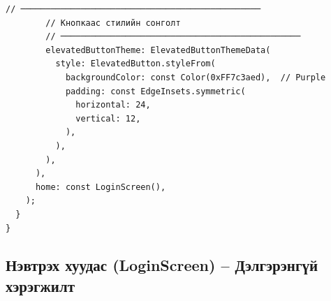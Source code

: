 \begin{lstlisting}[caption={main.dart -- ThemeData дэлгэрэнгүй}]
        // ────────────────────────────────────────────────
        // Кнопкаас стилийн сонголт
        // ────────────────────────────────────────────────
        elevatedButtonTheme: ElevatedButtonThemeData(
          style: ElevatedButton.styleFrom(
            backgroundColor: const Color(0xFF7c3aed),  // Purple
            padding: const EdgeInsets.symmetric(
              horizontal: 24,
              vertical: 12,
            ),
          ),
        ),
      ),
      home: const LoginScreen(),
    );
  }
}
\end{lstlisting}

\subsection{Нэвтрэх хуудас (LoginScreen) -- Дэлгэрэнгүй хэрэгжилт}


